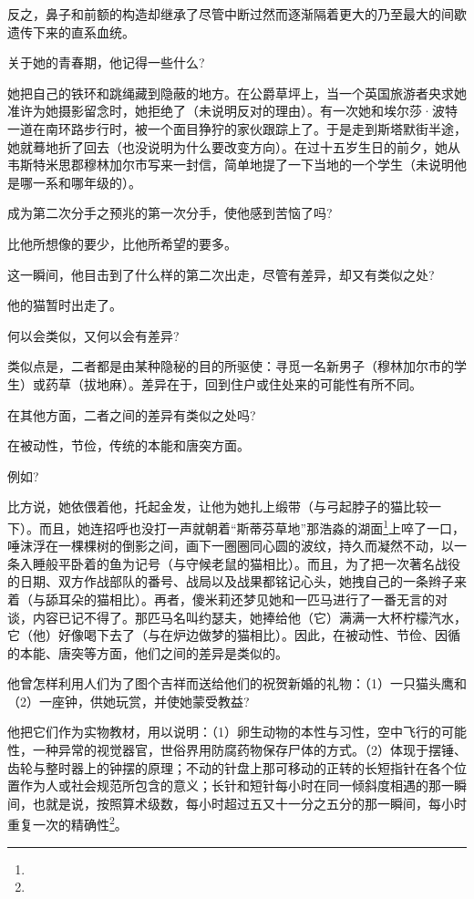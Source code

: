 \par 反之，鼻子和前额的构造却继承了尽管中断过然而逐渐隔着更大的乃至最大的间歇遗传下来的直系血统。
\par 关于她的青春期，他记得一些什么?
\par 她把自己的铁环和跳绳藏到隐蔽的地方。在公爵草坪上，当一个英国旅游者央求她准许为她摄影留念时，她拒绝了（未说明反对的理由）。有一次她和埃尔莎·波特一道在南环路步行时，被一个面目狰狞的家伙跟踪上了。于是走到斯塔默街半途，她就蓦地折了回去（也没说明为什么要改变方向）。在过十五岁生日的前夕，她从韦斯特米思郡穆林加尔市写来一封信，简单地提了一下当地的一个学生（未说明他是哪一系和哪年级的）。
\par 成为第二次分手之预兆的第一次分手，使他感到苦恼了吗?
\par 比他所想像的要少，比他所希望的要多。
\par 这一瞬间，他目击到了什么样的第二次出走，尽管有差异，却又有类似之处?
\par 他的猫暂时出走了。
\par 何以会类似，又何以会有差异?
\par 类似点是，二者都是由某种隐秘的目的所驱使：寻觅一名新男子（穆林加尔市的学生）或药草（拔地麻）。差异在于，回到住户或住处来的可能性有所不同。
\par 在其他方面，二者之间的差异有类似之处吗?
\par 在被动性，节俭，传统的本能和唐突方面。
\par 例如?
\par 比方说，她依偎着他，托起金发，让他为她扎上缎带（与弓起脖子的猫比较一下）。而且，她连招呼也没打一声就朝着“斯蒂芬草地”那浩淼的湖面\footnote{}上啐了一口，唾沫浮在一棵棵树的倒影之间，画下一圈圈同心圆的波纹，持久而凝然不动，以一条入睡般平卧着的鱼为记号（与守候老鼠的猫相比）。而且，为了把一次著名战役的日期、双方作战部队的番号、战局以及战果都铭记心头，她拽自己的一条辫子来着（与舔耳朵的猫相比）。再者，傻米莉还梦见她和一匹马进行了一番无言的对谈，内容已记不得了。那匹马名叫约瑟夫，她捧给他（它）满满一大杯柠檬汽水，它（他）好像喝下去了（与在炉边做梦的猫相比）。因此，在被动性、节俭、因循的本能、唐突等方面，他们之间的差异是类似的。
\par 他曾怎样利用人们为了图个吉祥而送给他们的祝贺新婚的礼物：（1）一只猫头鹰和（2）一座钟，供她玩赏，并使她蒙受教益?
\par 他把它们作为实物教材，用以说明：（1）卵生动物的本性与习性，空中飞行的可能性，一种异常的视觉器官，世俗界用防腐药物保存尸体的方式。（2）体现于摆锤、齿轮与整时器上的钟摆的原理；不动的针盘上那可移动的正转的长短指针在各个位置作为人或社会规范所包含的意义；长针和短针每小时在同一倾斜度相遇的那一瞬间，也就是说，按照算术级数，每小时超过五又十一分之五分的那一瞬间，每小时重复一次的精确性\footnote{}。
